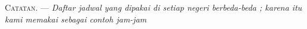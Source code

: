 %
%
%
%

\VUsaut{4.0mm}
\VUsaut{2.4mm}
\VUsaut{3.4mm}
\textsc{Catatan.} --- \textit{Daftar jadwal yang dipakai di setiap
negeri berbeda-beda ; karena itu kami memakai sebagai contoh
jam-jam} 

